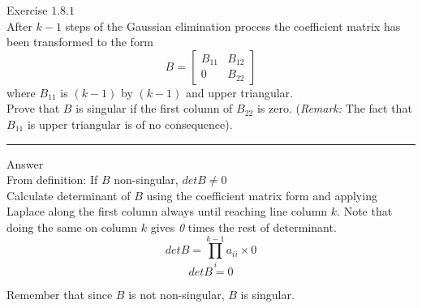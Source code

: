 \documentclass[11pt]{article}
\begin{document}
Exercise $1.8.1$\\


After $k - 1$ steps of the Gaussian elimination process the coefficient matrix has been transformed to the form
$$
B = 
\begin{bmatrix}
	B_{11}	& B_{12}\\
	0		& B_{22}
\end{bmatrix}
$$
where $B_{11}$ is $(k - 1)$ by $(k-1)$ and upper triangular.\\

Prove that $B$ is singular if the first column of $B_{22}$ is zero. (\textit{Remark:} The fact that $B_{11}$ is upper triangular is of no consequence). \\

\noindent\rule{\textwidth}{1pt}

Answer\\

From definition: If $B$ non-singular, $det B \neq 0$\\

Calculate determinant of $B$ using the coefficient matrix form and applying Laplace along the first column always until reaching line column $k$. Note that doing the same on column $k$ gives \textit{0} times the rest of determinant.
$$
det B = \prod_i^{k-1}a_{ii}\times0
$$
$$
det B = 0
$$ 

Remember that since $B$ is not non-singular, $B$ is singular.
\end{document}
